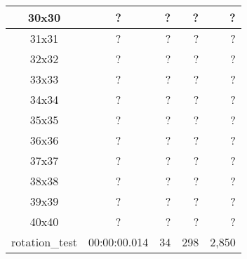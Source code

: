 \begin{center}
\begin{tabular}{|c|c|r|r|r|}
		30x30 & ? & ? & ? & ? \\ \hline
		31x31 & ? & ? & ? & ? \\ \hline
		32x32 & ? & ? & ? & ? \\ \hline
		33x33 & ? & ? & ? & ? \\ \hline
		34x34 & ? & ? & ? & ? \\ \hline
		35x35 & ? & ? & ? & ? \\ \hline
		36x36 & ? & ? & ? & ? \\ \hline
		37x37 & ? & ? & ? & ? \\ \hline
		38x38 & ? & ? & ? & ? \\ \hline
		39x39 & ? & ? & ? & ? \\ \hline
		40x40 & ? & ? & ? & ? \\ \hline
		rotation\_test & 00:00:00.014 & 34 & 298 & 2,850 \\ \hline

    \end{tabular}
\end{center}
